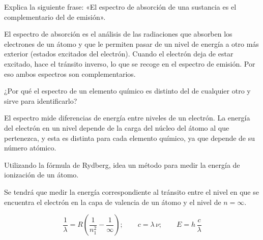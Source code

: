 \begin{question}
    Explica la siguiente frase: «El espectro de absorción de una sustancia es el complementario del de emisión».
    \begin{solu}
        El espectro de absorción es el análisis de las radiaciones que
        absorben los electrones de un átomo y que le permiten pasar
        de un nivel de energía a otro más exterior (estados excitados
        del electrón). Cuando el electrón deja de estar excitado, hace
        el tránsito inverso, lo que se recoge en el espectro de emisión.
        Por eso ambos espectros son complementarios.
    \end{solu}
\end{question}

\begin{question}
    ¿Por qué el espectro de un elemento químico es distinto del de cualquier otro y sirve para identificarlo?

    \begin{solu}
        El espectro mide diferencias de energía entre niveles de un electrón.
        La energía del electrón en un
        nivel depende de la carga del núcleo del átomo al que pertenezca,
        y esta es distinta para cada elemento químico, ya que depende de su número atómico.
    \end{solu}
\end{question}

\begin{question}
    Utilizando la fórmula de Rydberg, idea un método para medir la energía de ionización de un átomo.

    \begin{solu}
        Se tendrá que medir la energía correspondiente al tránsito entre el nivel en que se encuentra el electrón en la capa de valencia de un átomo y el nivel de \(n = \infty\).

        \[
            \frac{1}{\lambda} = R\left(\frac{1}{n_1^2} - \frac{1}{\infty}\right); \qquad c = \lambda\,\nu; \qquad E = h\,\frac{c}{\lambda}
        \]
    \end{solu}
\end{question}

